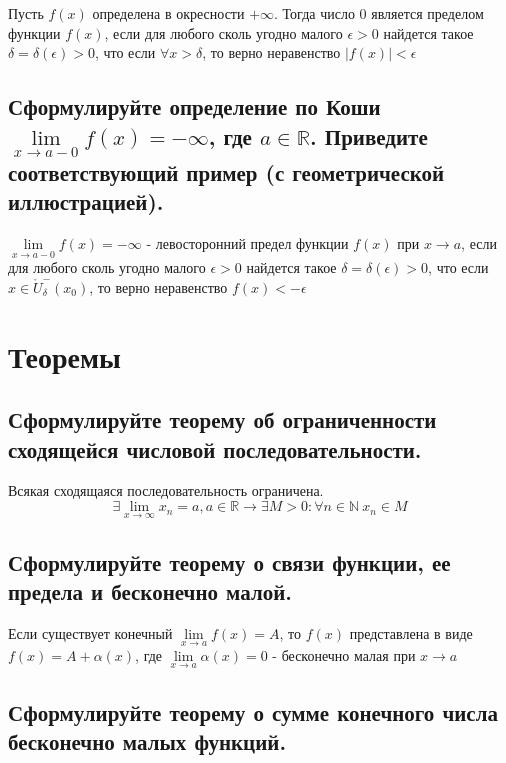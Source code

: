     Пусть $f(x)$ определена в окресности $+\infty$. Тогда число 0 является пределом функции
    $f(x)$, если для любого сколь угодно малого $\epsilon > 0$ найдется такое $\delta = \delta(\epsilon) > 0$, что
    если $\forall x > \delta$, то верно неравенство $|f(x)| < \epsilon$

    \subsection{Сформулируйте определение по Коши $\lim\limits_{x \to a-0} f (x) = -\infty$, где $a \in 
    \mathbb{R}$. Приведите соответствующий пример (с геометрической иллюстрацией).}

    $\lim\limits_{x \to a-0} f (x) = -\infty$ - левосторонний предел функции $f(x)$ при $x \to a$, если 
    для любого сколь угодно малого $\epsilon > 0$ найдется такое $\delta = \delta(\epsilon) > 0$, что если
    $x \in \mathring U_\delta^-(x_0)$, то верно неравенство $f(x) < -\epsilon$

\newpage
\section{Теоремы}

    \subsection{Сформулируйте теорему об ограниченности сходящейся числовой последовательности. }

    Всякая сходящаяся последовательность ограничена.
    $$\exists \lim\limits_{x \to \infty} x_n = a, a \in \mathbb{R} \rightarrow 
    \exists M > 0: \forall n \in \mathbb{N} \  x_n \in M$$

    \subsection{Сформулируйте теорему о связи функции, ее предела и бесконечно малой. }

    Если существует конечный $\lim\limits_{x \to a} f(x) = A$, то $f(x)$ представлена в виде
    $f(x) = A + \alpha  (x)$, где $\lim\limits_{x \to a} \alpha  (x) = 0$ - бесконечно малая при $x \to a$

    \subsection{Сформулируйте теорему о сумме конечного числа бесконечно малых функций. }

